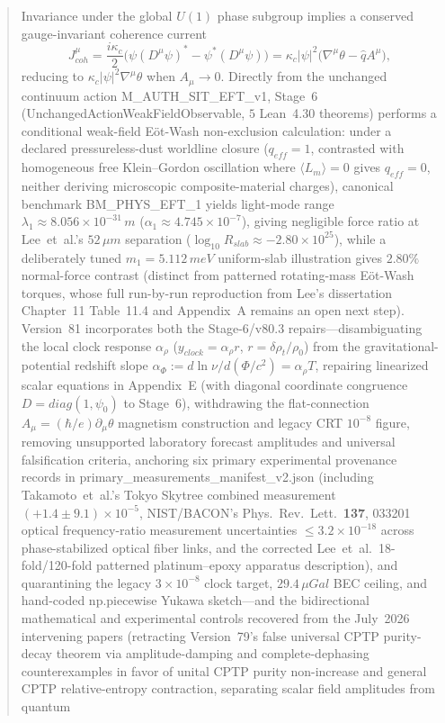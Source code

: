 \documentclass[american,11pt,letterpaper]{article}
\def\mathcal#1{#1}%
\def\mathrm#1{#1}%
\def\texttt#1{#1}%
\def\emph#1{#1}%
\begin{document}
\begin{abstract}
Invariance under the global $U(1)$ phase subgroup implies a conserved gauge-invariant coherence current
\begin{equation}
J^\mu_{\mathrm{coh}}
= \frac{i\kappa_c}{2}\bigl(\psi(D^\mu\psi)^* - \psi^*(D^\mu\psi)\bigr)
= \kappa_c |\psi|^2\bigl(\nabla^\mu\theta - \hat{q}A^\mu\bigr),
\label{eq:abstract_coherence_current}
\end{equation}
reducing to $\kappa_c|\psi|^2\nabla^\mu\theta$ when $A_\mu \to 0$. Directly from the unchanged continuum action \texttt{M\_AUTH\_SIT\_EFT\_v1}, Stage~6 (\texttt{UnchangedActionWeakFieldObservable}, $5$ Lean~4.30 theorems) performs a \emph{conditional weak-field E\"ot-Wash non-exclusion calculation}: under a declared pressureless-dust worldline closure ($q_{\mathrm{eff}} = 1$, contrasted with homogeneous free Klein--Gordon oscillation where $\langle\mathcal{L}_m\rangle = 0$ gives $q_{\mathrm{eff}} = 0$, neither deriving microscopic composite-material charges), canonical benchmark \texttt{BM\_PHYS\_EFT\_1} yields light-mode range $\lambda_1 \approx 8.056\times 10^{-31}\,\mathrm{m}$ ($\alpha_1 \approx 4.745\times 10^{-7}$), giving negligible force ratio at Lee~\emph{et~al.}'s $52\,\mu\mathrm{m}$ separation ($\log_{10} R_{\mathrm{slab}} \approx -2.80\times 10^{25}$), while a deliberately tuned $m_1 = 5.112\,\mathrm{meV}$ uniform-slab illustration gives $2.80\%$ normal-force contrast (distinct from patterned rotating-mass E\"ot-Wash torques, whose full run-by-run reproduction from Lee's dissertation Chapter~11 Table~11.4 and Appendix~A remains an open next step). Version~81 incorporates both the Stage-6/v80.3 repairs---disambiguating the local clock response $\alpha_\rho$ ($y_{\mathrm{clock}} = \alpha_\rho r$, $r = \delta\rho_t/\rho_0$) from the gravitational-potential redshift slope $\alpha_\Phi := d\ln\nu/d(\Phi/c^2) = \alpha_\rho\mathcal{T}$, repairing linearized scalar equations in Appendix~E (with diagonal coordinate congruence $D = \mathrm{diag}(1, \psi_0)$ to Stage~6), withdrawing the flat-connection $A_\mu = (\hbar/e)\partial_\mu\theta$ magnetism construction and legacy CRT $10^{-8}$ figure, removing unsupported laboratory forecast amplitudes and universal falsification criteria, anchoring six primary experimental provenance records in \texttt{primary\_measurements\_manifest\_v2.json} (including Takamoto~\emph{et~al.}'s Tokyo Skytree combined measurement $(+1.4 \pm 9.1)\times 10^{-5}$, NIST/BACON's \emph{Phys.\ Rev.\ Lett.}\ \textbf{137}, 033201 optical frequency-ratio measurement uncertainties $\le 3.2\times 10^{-18}$ across phase-stabilized optical fiber links, and the corrected Lee~\emph{et~al.}\ 18-fold/120-fold patterned platinum--epoxy apparatus description), and quarantining the legacy $3\times 10^{-8}$ clock target, $29.4\,\mu\mathrm{Gal}$ BEC ceiling, and hand-coded \texttt{np.piecewise} Yukawa sketch---and the bidirectional mathematical and experimental controls recovered from the July~2026 intervening papers (retracting Version~79's false universal CPTP purity-decay theorem via amplitude-damping and complete-dephasing counterexamples in favor of unital CPTP purity non-increase and general CPTP relative-entropy contraction, separating scalar field amplitudes from quantum 
\end{abstract}
\end{document}
